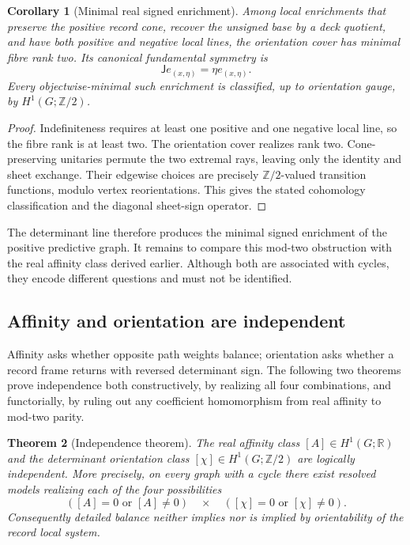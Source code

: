 \documentclass[11pt]{article}
\newtheorem{theorem}{Theorem}[section]
\newtheorem{corollary}[theorem]{Corollary}
\theoremstyle{definition}
\theoremstyle{remark}
\newcommand{\R}{\mathbb R}
\newcommand{\J}{\mathsf J}
\newcommand{\Ztwo}{\mathbb Z/2}
\begin{document}
\begin{corollary}[Minimal real signed enrichment]
\label{cor:minimal-signed-enrichment}
Among local enrichments that preserve the positive record cone, recover the
unsigned base by a deck quotient, and have both positive and negative local
lines, the orientation cover has minimal fibre rank two.  Its canonical
fundamental symmetry is
\[
 \J e_{(x,\eta)}=\eta e_{(x,\eta)}.
\]
Every objectwise-minimal such enrichment is classified, up to orientation
gauge, by $H^1(G;\Ztwo)$.
\end{corollary}

\begin{proof}
Indefiniteness requires at least one positive and one negative local line, so
the fibre rank is at least two.  The orientation cover realizes rank two.
Cone-preserving unitaries permute the two extremal rays, leaving only the
identity and sheet exchange.  Their edgewise choices are precisely
$\Ztwo$-valued transition functions, modulo vertex reorientations.  This gives
the stated cohomology classification and the diagonal sheet-sign operator.
\end{proof}

The determinant line therefore produces the minimal signed enrichment of the
positive predictive graph.  It remains to compare this mod-two obstruction with
the real affinity class derived earlier.  Although both are associated with
cycles, they encode different questions and must not be identified.

\subsection{Affinity and orientation are independent}

Affinity asks whether opposite path weights balance; orientation asks whether a
record frame returns with reversed determinant sign.  The following two theorems
prove independence both constructively, by realizing all four combinations, and
functorially, by ruling out any coefficient homomorphism from real affinity to
mod-two parity.

\begin{theorem}[Independence theorem]
\label{thm:independence}
The real affinity class $[A]\in H^1(G;\R)$ and the determinant orientation
class $[\chi]\in H^1(G;\Ztwo)$ are logically independent.  More precisely, on
every graph with a cycle there exist resolved models realizing each of the four
possibilities
\[
 ([A]=0\text{ or }[A]\ne0)
 \quad\times\quad
 ([\chi]=0\text{ or }[\chi]\ne0).
\]
Consequently detailed balance neither implies nor is implied by orientability
of the record local system.
\end{theorem}
\end{document}
